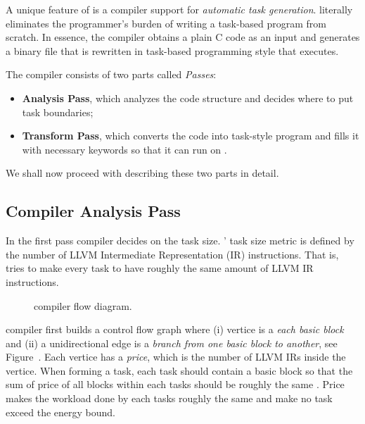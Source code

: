 A unique feature of \sys is a compiler support for \emph{automatic task generation}. \sys literally eliminates the programmer's burden of writing a task-based program from scratch. In essence, the \sys compiler obtains a plain C code as an input and generates a binary file that is rewritten in task-based programming style that \sys executes.

The compiler consists of two parts called \emph{Passes}:
%
\begin{itemize}
	\item \textbf{Analysis Pass}, which analyzes the code structure and decides where to put task boundaries;
	\item \textbf{Transform Pass}, which converts the code into task-style program and fills it with necessary \sys keywords so that it can run on \sys.
\end{itemize}
%
We shall now proceed with describing these two parts in detail.

\subsection{Compiler Analysis Pass}
\label{sec:compiler_analysis_pass}

In the first pass \sys compiler decides on the task size. \sys' task size metric is defined by the number of LLVM Intermediate Representation (IR) instructions. That is, \sys tries to make every task to have roughly the same amount of LLVM IR instructions. 

\begin{figure}
	\centering
	\caption{\sys compiler flow diagram.}
	\label{fig:compiler_graph}
\end{figure}

\sys compiler first builds a control flow graph where (i) vertice is a \emph{each basic block} and (ii) a unidirectional edge is a \emph{branch from one basic block to another}, see Figure~\cite{fig:compiler_graph}. Each vertice has a {\em price}, which is the number of LLVM IRs inside the vertice. When forming a task, each task should contain a basic block so that the sum of price of all blocks within each tasks should be roughly the same . Price makes the workload done by each tasks roughly the same and make no task exceed the energy bound.

